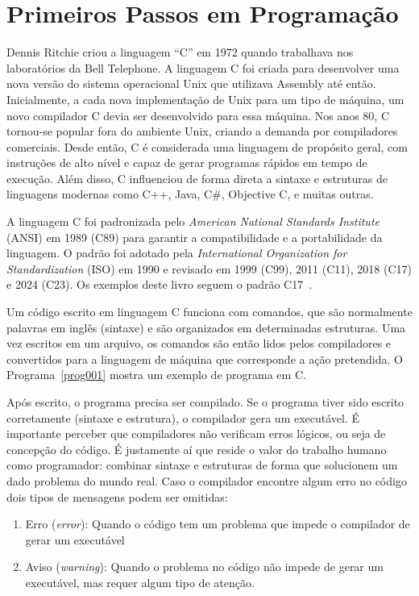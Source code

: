 \documentclass[11pt,fleqn]{book} %
\begin{document}
\newpage
\section{Primeiros Passos em Programação}\label{disc:primeirospassos}

Dennis Ritchie criou a linguagem ``C'' em 1972 quando trabalhava nos laboratórios da Bell Telephone.
A linguagem C foi criada para desenvolver uma nova versão do sistema operacional Unix que utilizava Assembly até então.
Inicialmente, a cada nova implementação de Unix para um tipo de máquina, um novo compilador C devia ser desenvolvido para essa máquina.
Nos anos 80, C tornou-se popular fora do ambiente Unix, criando a demanda por compiladores comerciais.
Desde então, C é considerada uma linguagem de propósito geral, com instruções de alto nível e capaz de gerar programas rápidos em tempo de execução.
Além disso, C influenciou de forma direta a sintaxe e estruturas de linguagens modernas como C++, Java, C\#, Objective C, e muitas outras.

A linguagem C foi padronizada pelo \textit{American National Standards Institute} (ANSI) em 1989 (C89) para garantir a compatibilidade e a portabilidade da linguagem.
O padrão foi adotado pela \textit{International Organization for Standardization} (ISO) em 1990 e revisado em 1999 (C99), 2011 (C11), 2018 (C17) e 2024 (C23).
Os exemplos deste livro seguem o padrão C17~\cite{isoc17}.

Um código escrito em linguagem C funciona com comandos, que são normalmente palavras em inglês (sintaxe) e são organizados em determinadas estruturas.
Uma vez escritos em um arquivo, os comandos são então lidos pelos compiladores e convertidos para a linguagem de máquina que corresponde a ação pretendida.
O Programa~\ref{prog001} mostra um exemplo de programa em C.



Após escrito, o programa precisa ser compilado. 
Se o programa tiver sido escrito corretamente (sintaxe e estrutura), o compilador gera um executável.
É importante perceber que compiladores não verificam erros lógicos, ou seja de concepção do código.
É justamente aí que reside o valor do trabalho humano como programador: combinar sintaxe e estruturas de forma que solucionem um dado problema do mundo real.
Caso o compilador encontre algum erro no código dois tipos de mensagens podem ser emitidas:
\begin{enumerate}
	\item Erro (\textit{error}): Quando o código tem um problema que impede o compilador de gerar um executável
	\item Aviso (\textit{warning}): Quando o problema no código não impede de gerar um executável, mas requer algum tipo de atenção.
\end{enumerate}
\end{document}
